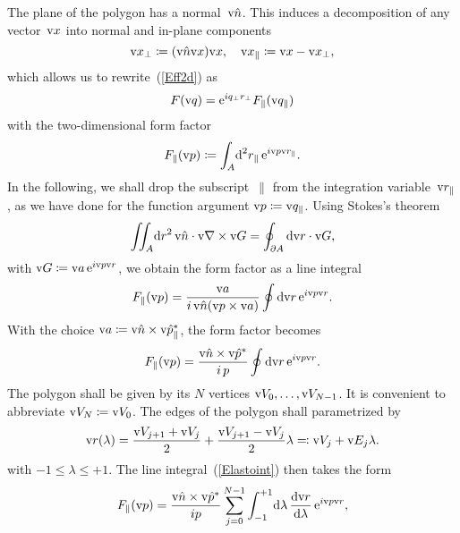 The plane of the polygon has a normal~$\text{v}{\hat n}$.
This induces a decomposition of any vector~$\text{v}{x}$ into normal
and in-plane components
\begin{equation}
  \text{v}{x}_\perp\coloneqq (\text{v}{\hat n}\text{v}{x})\text{v}{x},\quad
  \text{v}{x}_\parallel\coloneqq\text{v}{x}-\text{v}{x}_\perp,
\end{equation}
which allows us to rewrite~(\ref{Eff2d}) as
%
\begin{equation}
  F(\text{v}{q})=\text{e}^{iq_\perp r_\perp}F_\parallel(\text{v}{q}_\parallel)
\end{equation}
with the two-dimensional form factor
\begin{equation}
  F_\parallel(\text{v}{p})
  \coloneqq \int_A\!\text{d}^2r_\parallel\, \text{e}^{i\text{v}{p}\text{v}{r}_\parallel}.
\end{equation}
In the following, we shall drop the subscript~$\parallel$
from the integration variable~$\text{v}{r}_\parallel$,
as we have done for the function argument $\text{v}{p}\coloneqq\text{v}{q}_\parallel$.
Using Stokes's theorem
\begin{equation}
  \iint_A\!\text{d} r^2\,\text{v}{\hat n}\cdot\text{v}{\nabla}\times\text{v}{G} = \oint_{\partial A} \text{d}\text{v}{r}\cdot\text{v}{G},
\end{equation}
with $\text{v}{G}\coloneqq\text{v}{a}\, \text{e}^{i\text{v}{p}\text{v}{r}}$,
we obtain the form factor as a line integral
\begin{equation}
  F_\parallel(\text{v}{p})=\frac{\text{v}{a}}{i\, \text{v}{\hat n}(\text{v}{p}\times\text{v}{a})} \oint \text{d}\text{v}{r}\,\text{e}^{i\text{v}{p}\text{v}{r}}.
\end{equation}
With the choice $\text{v}{a}\coloneqq\text{v}{\hat n}\times\text{v}{\hat p}_\parallel^*$,
the form factor becomes
\begin{equation}\label{Elastoint}
  F_\parallel(\text{v}{p})=\frac{\text{v}{\hat n}\times\text{v}{\hat p}^*}{i\,p} \oint \text{d}\text{v}{r}\,\text{e}^{i\text{v}{p}\text{v}{r}}.
\end{equation}
The polygon shall be given by its $N$ vertices $\text{v}{V}_0,\ldots,\text{v}{V}_{N-1}$.
It is convenient to abbreviate $\text{v}{V}_N\coloneqq\text{v}{V}_0$.
The edges of the polygon shall parametrized by
\begin{equation}
  \text{v}{r}(\lambda) = \frac{\text{v}{V}_{j+1}+\text{v}{V}_j}{2} + \frac{\text{v}{V}_{j+1}-\text{v}{V}_j}{2} \lambda
  \eqqcolon \text{v}{V}_j + \text{v}{E}_j\lambda.
\end{equation}
with $-1\le\lambda\le+1$.
The line integral~(\ref{Elastoint}) then takes the form
\begin{equation}
    F_\parallel(\text{v}{p})
   = \frac{\text{v}{\hat n}\times\text{v}{\hat p}^*}{ip} \sum_{j=0}^{N-1}
              \int_{-1}^{+1}\!\text{d}\lambda\, \frac{\text{d}\text{v}{r}}{\text{d}\lambda}\,\text{e}^{i\text{v}{p}\text{v}{r}},
\end{equation}
